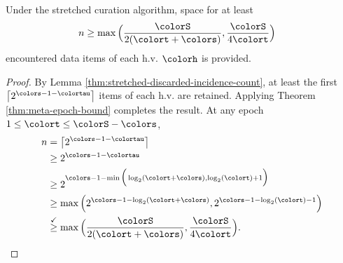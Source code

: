 \begin{corollary}
\label{thm:stretched-reservation-count}
Under the stretched curation algorithm, space for at least
\begin{align*}
n &\geq
\max\Big(
  \frac{\colorS}{2(\colort + \colors)},
  \frac{\colorS}{4\colort}
\Big)
\end{align*}
encountered data items of each h.v. $\colorh$ is provided.
\end{corollary}
\begin{proof}

By Lemma \ref{thm:stretched-discarded-incidence-count}, at least the first $\left\lceil 2^{\colors - 1 - \colortau} \right\rceil$ items of each h.v. are retained.
Applying Theorem \ref{thm:meta-epoch-bound} completes the result.
At any epoch $1 \leq \colort \leq \colorS - \colors$,
\begin{align*}
n
&= \left\lceil 2^{\colors - 1 - \colortau} \right\rceil\\
&\geq 2^{\colors - 1 - \colortau}\\
&\geq2^{\colors - 1 - \min\Big(
  \log_2(\colort + \colors),
  \log_2(\colort) + 1
\Big)}\\
&\geq \max\Big(
  2^{\colors - 1 - \log_2(\colort + \colors)},
  2^{\colors - 1 - \log_2(\colort) - 1}
\Big)\\
&\stackrel{\checkmark}{\geq} \max\Big(
  \frac{\colorS}{2(\colort + \colors)},
  \frac{\colorS}{4\colort}
\Big).
\end{align*}

\end{proof}
